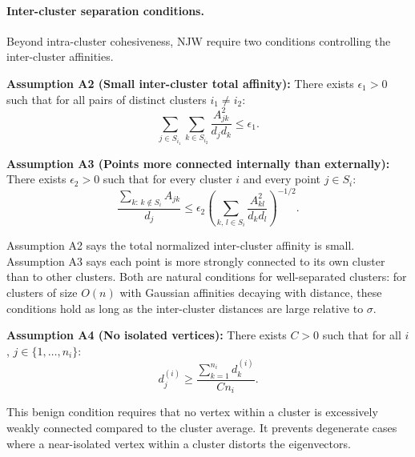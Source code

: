 \documentclass[11pt]{article}
\theoremstyle{plain}
\theoremstyle{definition}
\begin{document}
\paragraph{Inter-cluster separation conditions.}
Beyond intra-cluster cohesiveness, NJW require two conditions controlling the inter-cluster affinities.

\begin{keybox}
\textbf{Assumption A2 (Small inter-cluster total affinity):} There exists $\epsilon_1 > 0$ such that for all pairs of distinct clusters $i_1 \neq i_2$:
\begin{equation}
    \sum_{j \in S_{i_1}} \sum_{k \in S_{i_2}} \frac{A_{jk}^2}{d_j d_k} \leq \epsilon_1.
    \label{eq:A2}
\end{equation}
\end{keybox}

\begin{keybox}
\textbf{Assumption A3 (Points more connected internally than externally):} There exists $\epsilon_2 > 0$ such that for every cluster $i$ and every point $j \in S_i$:
\begin{equation}
    \frac{\sum_{k:\, k \notin S_i} A_{jk}}{d_j} \leq \epsilon_2 \left(\sum_{k,\, l \in S_i} \frac{A_{kl}^2}{d_k d_l}\right)^{-1/2}.
    \label{eq:A3}
\end{equation}
\end{keybox}

Assumption A2 says the total normalized inter-cluster affinity is small. Assumption A3 says each point is more strongly connected to its own cluster than to other clusters. Both are natural conditions for well-separated clusters: for clusters of size $O(n)$ with Gaussian affinities decaying with distance, these conditions hold as long as the inter-cluster distances are large relative to $\sigma$.

\begin{keybox}
\textbf{Assumption A4 (No isolated vertices):} There exists $C > 0$ such that for all $i$, $j \in \{1,\ldots,n_i\}$:
\begin{equation}
    d_j^{(i)} \geq \frac{\sum_{k=1}^{n_i} d_k^{(i)}}{C n_i}.
    \label{eq:A4}
\end{equation}
\end{keybox}

This benign condition requires that no vertex within a cluster is excessively weakly connected compared to the cluster average. It prevents degenerate cases where a near-isolated vertex within a cluster distorts the eigenvectors.
\end{document}
